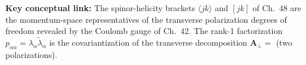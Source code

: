 \documentclass[12pt]{article}
\begin{document}
\begin{mdframed}[backgroundcolor=blue!5]
\textbf{Key conceptual link:} The spinor-helicity brackets $\langle jk\rangle$ and $[jk]$
of Ch.~48 are the momentum-space representatives of the transverse polarization degrees
of freedom revealed by the Coulomb gauge of Ch.~42.  The rank-1 factorization
$p_{\alpha\dot\alpha}=\lambda_\alpha\tilde\lambda_{\dot\alpha}$ is the covariantization
of the transverse decomposition $\mathbf{A}_\perp = $ (two polarizations).
\end{mdframed}

\vfill

\end{document}
